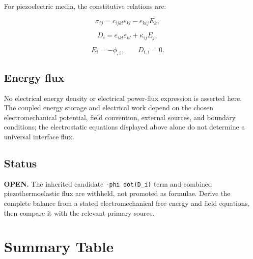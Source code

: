 For piezoelectric media, the constitutive relations are:

\begin{equation}
\sigma_{ij} = c_{ijkl}\varepsilon_{kl} - e_{kij}E_k,
\label{ef:piezo:1}
\end{equation}

\begin{equation}
D_i = e_{ikl}\varepsilon_{kl} + \kappa_{ij}E_j,
\label{ef:piezo:2}
\end{equation}

\begin{equation}
E_i = -\phi_{,i}, \qquad D_{i,i} = 0.
\label{ef:piezo:3}
\end{equation}

\subsection{Energy flux}

No electrical energy density or electrical power-flux expression is asserted here. The coupled energy storage and electrical work depend on the chosen electromechanical potential, field convention, external sources, and boundary conditions; the electrostatic equations displayed above alone do not determine a universal interface flux.

\subsection{Status}

\textbf{OPEN.} The inherited candidate \texttt{-phi dot(D\_i)} term and combined piezothermoelastic flux are withheld, not promoted as formulae. Derive the complete balance from a stated electromechanical free energy and field equations, then compare it with the relevant primary source.

\section{Summary Table}

